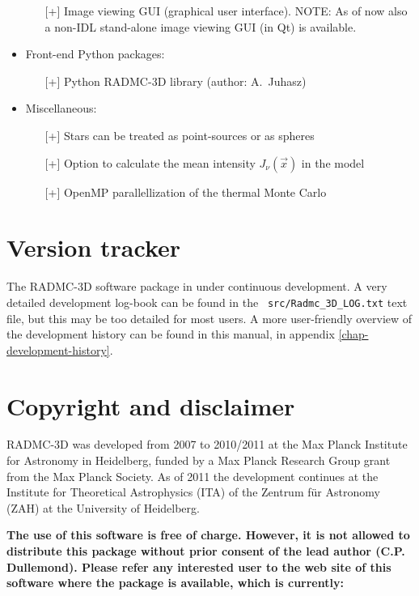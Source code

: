 \documentclass{report}
\begin{document}
\begin{itemize}
\begin{itemize}
    \item[][+] Image viewing GUI (graphical user interface). NOTE: As of now
      also a non-IDL stand-alone image viewing GUI (in Qt) is available.
  \end{itemize}
\item Front-end Python packages:
  \begin{itemize}
    \item[][+] Python RADMC-3D library (author: A.~Juhasz)
  \end{itemize}
\item Miscellaneous:
  \begin{itemize}
    \item[][+] Stars can be treated as point-sources or as spheres
    \item[][+] Option to calculate the mean intensity $J_\nu(\vec x)$ in the model
    \item[][+] OpenMP parallellization of the thermal Monte Carlo
  \end{itemize}
\end{itemize}


\section{Version tracker}
The RADMC-3D software package in under continuous development. A very
detailed development log-book can be found in the {\small\tt
  src/Radmc\_3D\_LOG.txt} text file, but this may be too detailed for most
users. A more user-friendly overview of the development history can be 
found in this manual, in appendix \ref{chap-development-history}.


\section{Copyright and disclaimer} 
RADMC-3D was developed from 2007 to 2010/2011 at the Max Planck Institute
for Astronomy in Heidelberg, funded by a Max Planck Research Group grant
from the Max Planck Society. As of 2011 the development continues at the
Institute for Theoretical Astrophysics (ITA) of the Zentrum f\"ur Astronomy
(ZAH) at the University of Heidelberg.

{\bf The use of this software is free of charge. However, it is not allowed
  to distribute this package without prior consent of the lead author
  (C.P. Dullemond). Please refer any interested user to the web site of this
  software where the package is available, which is currently:}
\end{document}
